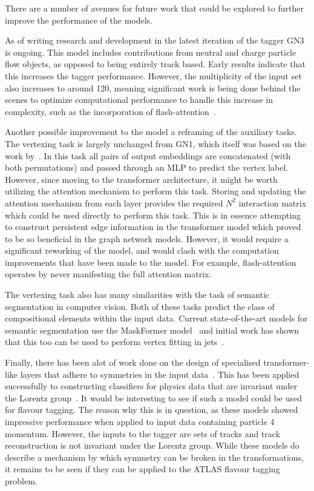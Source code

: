 There are a number of avenues for future work that could be explored to further improve the performance of the models.

As of writing research and development in the latest iteration of the tagger GN3 is ongoing.
This model includes contributions from neutral and charge particle flow objects, as opposed to being entirely track based.
Early results indicate that this increases the tagger performance.
However, the multiplicity of the input set also increases to around 120, meaning significant work is being done behind the scenes to optimize computational performance to handle this increase in complexity, such as the incorporation of flash-attention~\cite{FlashAttentionFastMemoryEfficient}.

Another possible improvement to the model a reframing of the auxiliary tasks.
The vertexing task is largely unchanged from GN1, which itself was based on the work by~\textcite{SecondaryVertexFinding}.
In this task all pairs of output embeddings are concatenated (with both permutations) and passed through an MLP to predict the vertex label.
However, since moving to the transformer architecture, it might be worth utilizing the attention mechanism to perform this task.
Storing and updating the attention mechanism from each layer provides the required $N^2$ interaction matrix which could be used directly to perform this task.
This is in essence attempting to construct persistent edge information in the transformer model which proved to be so beneficial in the graph network models.
However, it would require a significant reworking of the model, and would clash with the computation improvements that have been made to the model.
For example, flash-attention operates by never manifesting the full attention matrix.

The vertexing task also has many similarities with the task of semantic segmentation in computer vision.
Both of these tasks predict the class of compositional elements within the input data.
Current state-of-the-art models for semantic segmentation use the MaskFormer model~\cite{MaskFormer} and initial work has shown that this too can be used to perform vertex fitting in jets~\cite{MaskFormerJets}.

Finally, there has been alot of work done on the design of specialised transformer-like layers that adhere to symmetries in the input data~\cite{GeometricAlgebraTransformer}.
This has been applied successfully to constructing classifiers for physics data that are invariant under the Lorentz group~\cite{LorentzEquivariantGeometricAlgebra}.
It would be interesting to see if such a model could be used for flavour tagging.
The reason why this is in question, as these models showed impressive performance when applied to input data containing particle 4 momentum.
However, the inputs to the tagger are sets of tracks and track reconstruction is not invariant under the Lorentz group.
While these models do describe a mechanism by which symmetry can be broken in the transformations, it remains to be seen if they can be applied to the ATLAS flavour tagging problem.






